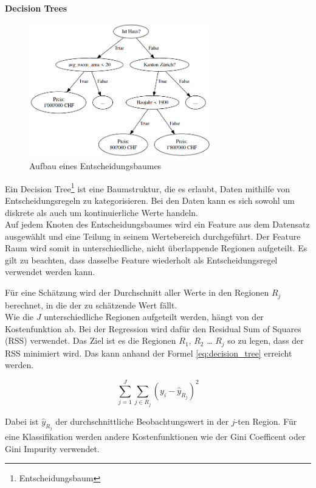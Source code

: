 \textbf{Decision Trees}

\begin{figure}[h]\label{fig:decision_tree}
  \centering
  \includegraphics[width=0.7\textwidth]{images/decision_tree.png}
  \caption[Aufbau eines Entscheidungsbaumes]{Aufbau eines Entscheidungsbaumes}
\end{figure}

Ein Decision Tree\footnote{Entscheidungsbaum} ist eine Baumstruktur, die es erlaubt, Daten mithilfe von Entscheidungsregeln zu kategorisieren. Bei den Daten kann es sich sowohl um diskrete als auch um kontinuierliche Werte handeln.\\
Auf jedem Knoten des Entscheidungsbaumes wird ein Feature aus dem Datensatz ausgewählt und eine Teilung in seinem Wertebereich durchgeführt. Der Feature Raum wird somit in unterschiedliche, nicht überlappende Regionen aufgeteilt. Es gilt zu beachten, dass dasselbe Feature wiederholt als Entscheidungsregel verwendet werden kann.

Für eine Schätzung wird der Durchschnitt aller Werte in den Regionen $R_j$ berechnet, in die der zu schätzende Wert fällt.\\
Wie die  $J$ unterschiedliche Regionen aufgeteilt werden, hängt von der Kostenfunktion ab. Bei der Regression wird dafür den Residual Sum of Squares (RSS) verwendet. Das Ziel ist es die Regionen $R_1$, $R_2$ … $R_j$ so zu legen, dass der RSS minimiert wird. Das kann anhand der Formel \eqref{eq:decision_tree} erreicht werden.

\begin{equation}
\label{eq:decision_tree}
\sum_{j=1}^{J} \sum_{j \in R_j}^{} (y_i - \hat{y}_{R_j})^2
\end{equation}

Dabei ist $\hat{y}_{R_j}$ der durchschnittliche Beobachtungswert in der $j$-ten Region. Für eine Klassifikation werden andere Kostenfunktionen wie der Gini Coefficent oder Gini Impurity verwendet.

